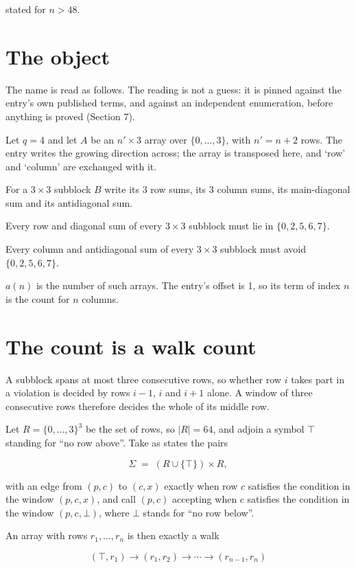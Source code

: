 \documentclass[11pt]{article}
\theoremstyle{definition}
\begin{document}
stated for $n > 48$.

\section{The object}

The name is read as follows. The reading is not a guess: it is pinned against the entry's own published terms, and against an independent enumeration, before anything is proved (Section 7).

Let $q = 4$ and let $A$ be an $n' \times 3$ array over $\{0,\dots,3\}$, with $n' = n + 2$ rows. The entry writes the growing direction across; the array is transposed here, and `row' and `column' are exchanged with it.

For a $3\times3$ subblock $B$ write its 3 row sums, its 3 column sums, its main-diagonal sum and its antidiagonal sum.

Every row and diagonal sum of every $3\times3$ subblock must lie in $\{0, 2, 5, 6, 7\}$.

Every column and antidiagonal sum of every $3\times3$ subblock must avoid $\{0, 2, 5, 6, 7\}$.

$a(n)$ is the number of such arrays. The entry's offset is 1, so its term of index $n$ is the count for $n$ columns.

\section{The count is a walk count}

A subblock spans at most three consecutive rows, so whether row $i$ takes part in a violation is decided by rows $i-1$, $i$ and $i+1$ alone. A window of three consecutive rows therefore decides the whole of its middle row.

Let $R = \{0,\dots,3\}^{3}$ be the set of rows, so $|R| = 64$, and adjoin a symbol $\top$ standing for ``no row above''. Take as states the pairs

\[\Sigma \;=\; (R \cup \{\top\}) \times R,\]

with an edge from $(p,c)$ to $(c,x)$ exactly when row $c$ satisfies the condition in the window $(p,c,x)$, and call $(p,c)$ accepting when $c$ satisfies the condition in the window $(p,c,\bot)$, where $\bot$ stands for ``no row below''.

An array with rows $r_1,\dots,r_n$ is then exactly a walk

\[(\top,r_1) \to (r_1,r_2) \to \cdots \to (r_{n-1},r_n)\]
\end{document}
